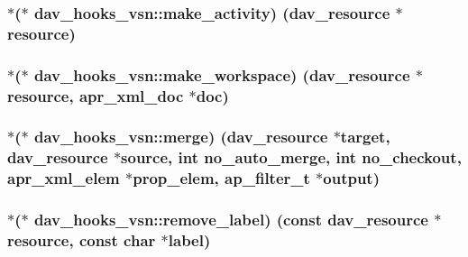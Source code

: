 \subsubsection[{\texorpdfstring{make\+\_\+activity}{make_activity}}]{$\ast$($\ast$ dav\+\_\+hooks\+\_\+vsn\+::make\+\_\+activity) ({\bf dav\+\_\+resource} $\ast${\bf resource})}\hypertarget{structdav__hooks__vsn_a294b0947b03c9957a60b62ee8f0ccb96}{}\label{structdav__hooks__vsn_a294b0947b03c9957a60b62ee8f0ccb96}
\subsubsection[{\texorpdfstring{make\+\_\+workspace}{make_workspace}}]{$\ast$($\ast$ dav\+\_\+hooks\+\_\+vsn\+::make\+\_\+workspace) ({\bf dav\+\_\+resource} $\ast${\bf resource}, {\bf apr\+\_\+xml\+\_\+doc} $\ast${\bf doc})}\hypertarget{structdav__hooks__vsn_a538b2e4704c7af2697596fa90be885b6}{}\label{structdav__hooks__vsn_a538b2e4704c7af2697596fa90be885b6}
\subsubsection[{\texorpdfstring{merge}{merge}}]{$\ast$($\ast$ dav\+\_\+hooks\+\_\+vsn\+::merge) ({\bf dav\+\_\+resource} $\ast$target, {\bf dav\+\_\+resource} $\ast${\bf source}, {\bf int} no\+\_\+auto\+\_\+merge, {\bf int} no\+\_\+checkout, {\bf apr\+\_\+xml\+\_\+elem} $\ast$prop\+\_\+elem, {\bf ap\+\_\+filter\+\_\+t} $\ast${\bf output})}\hypertarget{structdav__hooks__vsn_a906acfca8c20b1ecfca9738918e9b409}{}\label{structdav__hooks__vsn_a906acfca8c20b1ecfca9738918e9b409}
\subsubsection[{\texorpdfstring{remove\+\_\+label}{remove_label}}]{$\ast$($\ast$ dav\+\_\+hooks\+\_\+vsn\+::remove\+\_\+label) (const {\bf dav\+\_\+resource} $\ast${\bf resource}, const char $\ast${\bf label})}\hypertarget{structdav__hooks__vsn_a2bd175b6fb71488e5a6b270594f637fd}{}\label{structdav__hooks__vsn_a2bd175b6fb71488e5a6b270594f637fd}
